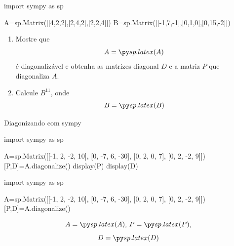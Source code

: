 \begin{frame}[label=autovalores,fragile=singleslide]{}

\begin{casa}
\begin{pycode}
import sympy as sp

A=sp.Matrix([[4,2,2],[2,4,2],[2,2,4]])
B=sp.Matrix([[-1,7,-1],[0,1,0],[0,15,-2]])
\end{pycode}
\begin{enumerate}
\item Mostre que 
\[A=\pyl{A}\]
é diagonalizável e obtenha as matrizes diagonal $D$ e a matriz $P$ que diagonaliza $A$.

\item Calcule $B^{11}$, onde 
\[B=\pyl{B}\]
\end{enumerate}

\end{casa}
\end{frame}

\begin{frame}[label=autovalores,,fragile=singleslide]{Diagonizando com sympy}
	\begin{footnotesize}
\begin{pyverbatim}
import sympy as sp

A=sp.Matrix([[-1, 2, -2, 10],
[0, -7, 6, -30],
[0, 2, 0, 7],
[0, 2, -2, 9]])
[P,D]=A.diagonalize()
display(P)
display(D)
\end{pyverbatim}
	\end{footnotesize}		

\begin{pycode}
import sympy as sp

A=sp.Matrix([[-1, 2, -2, 10], [0, -7, 6, -30], [0, 2, 0, 7], [0, 2, -2, 9]])
[P,D]=A.diagonalize()
\end{pycode}
\[A=\pyl{A},\, P=\pyl{P},\]
\[D=\pyl{D}\]

\end{frame}



